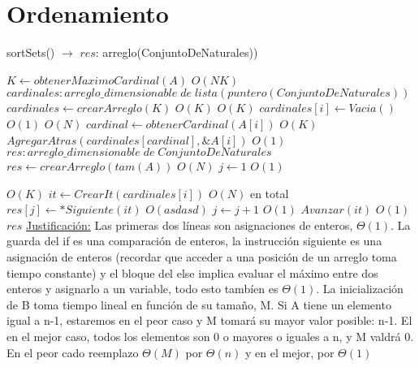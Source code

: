\documentclass[10pt, a4paper]{article}
\begin{document}



\maketitle

\section{Ordenamiento}

\begin{algorithm}[H]{sortSets() $\to$ $res$: arreglo(ConjuntoDeNaturales))}	
	\begin{algorithmic}[1]
			 \State $K \gets obtenerMaximoCardinal(A)$			\Comment $O(NK)$
			 \State $cardinales: arreglo\_dimensionable\; de\; lista(puntero(ConjuntoDeNaturales))$
			 \State $cardinales \gets crearArreglo(K)$			\Comment $O(K)$
			 			\Comment $O(K)$
			 	\State $cardinales[i]\gets Vacia()$			\Comment $O(1)$
			 \EndFor
			 			\Comment $O(N)$
			 	\State $cardinal \gets obtenerCardinal(A[i])$			\Comment $O(K)$
			 	\State $AgregarAtras(cardinales[cardinal], \&A[i])$			\Comment $O(1)$
			 \EndFor
			 \State $res: arreglo\_dimensionable\; de\; ConjuntoDeNaturales$
			 \State $res \gets crearArreglo(tam(A))$	\Comment $O(N)$
			 \State $j \gets 1$                    \Comment $O(1)$
    	
    						\Comment $O(K)$
    			\State $it \gets CrearIt(cardinales[i])$
    						\Comment $O(N)$ en total
			 		\State $res[j]\gets *Siguiente(it)$	\Comment $O(asdasd)$
			 		\State $j\gets j+1$	\Comment $O(1)$
			 		\State $Avanzar(it)$	\Comment $O(1)$
			 	\EndWhile
			\EndFor \\
			\Return $res$
		\medskip
		\Statex \underline{Justificación:} Las primeras dos líneas son asignaciones de enteros, $\Theta(1)$. La guarda del if es una comparación de enteros, la instrucción siguiente es una asignación de enteros (recordar que acceder a una posición de un arreglo toma tiempo constante) y el bloque del else implica evaluar el máximo entre dos enteros y asignarlo a un variable, todo esto tambíen es $\Theta(1)$. La inicialización de B toma tiempo lineal en función de su tamaño, M.
		Si A tiene un elemento igual a n-1, estaremos en el peor caso y M tomará su mayor valor posible: n-1. El en el mejor caso, todos los elementos son 0 o mayores o iguales a n, y M valdrá 0. En el peor cado reemplazo $\Theta(M)$ por $\Theta(n)$ y en el mejor, por $\Theta(1)$
    \end{algorithmic}
\end{algorithm}	
\end{document}
